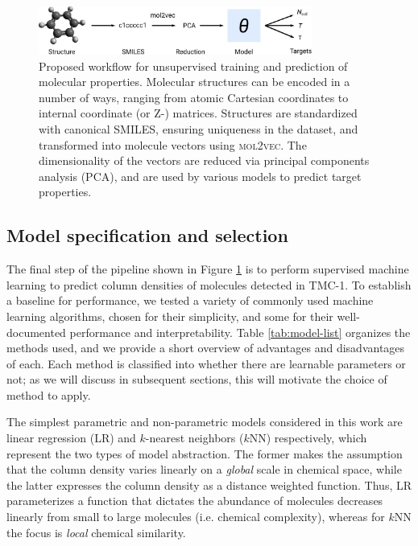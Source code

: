 \documentclass[twocolumn]{aastex63}
\begin{document}
\begin{figure}
\centering
\includegraphics[width=0.8\textwidth]{pipeline}
\caption{Proposed workflow for unsupervised training and prediction of molecular properties. Molecular structures can be encoded in a number of ways, ranging from atomic Cartesian coordinates to internal coordinate (or Z-) matrices. Structures are standardized with canonical SMILES, ensuring uniqueness in the dataset, and transformed into molecule vectors using \textsc{mol2vec}. The dimensionality of the vectors are reduced via principal components analysis (PCA), and are used by various models to predict target properties.}
\label{fig:pipeline}
\end{figure}

\subsection{Model specification and selection}

The final step of the pipeline shown in Figure \ref{fig:pipeline} is to perform supervised machine learning to predict column densities of molecules detected in TMC-1. To establish a baseline for performance, we tested a variety of commonly used machine learning algorithms, chosen for their simplicity, and some for their well-documented performance and interpretability. Table \ref{tab:model-list} organizes the methods used, and we provide a short overview of advantages and disadvantages of each. Each method is classified into whether there are learnable parameters or not; as we will discuss in subsequent sections, this will motivate the choice of method to apply.

The simplest parametric and non-parametric models considered in this work are linear regression (LR) and $k$-nearest neighbors ($k$NN) respectively, which represent the two types of model abstraction. The former makes the assumption that the column density varies linearly on a \emph{global} scale in chemical space, while the latter expresses the column density as a distance weighted function. Thus, LR parameterizes a function that dictates the abundance of molecules decreases linearly from small to large molecules (i.e. chemical complexity), whereas for $k$NN the focus is \emph{local} chemical similarity.
\end{document}

